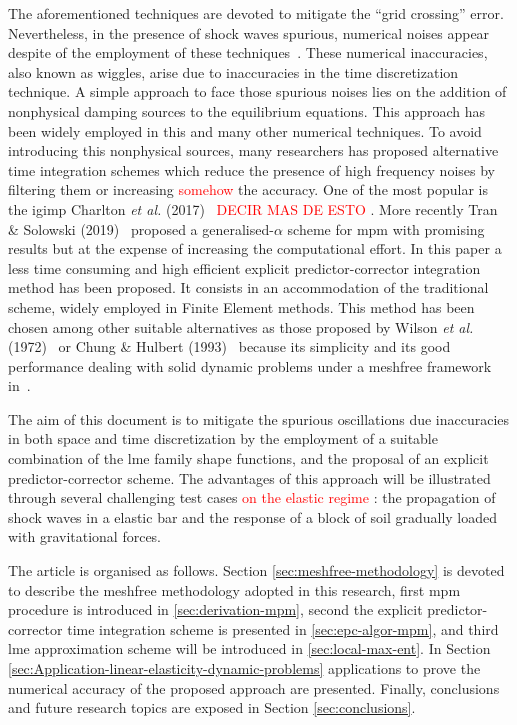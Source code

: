\documentclass[preprint,12pt,a4paper]{elsarticle}
\newcommand{\red}[1]{
  \textcolor{red}{{#1}}
}
\begin{document}
The aforementioned techniques are devoted to mitigate the
``grid crossing'' error. Nevertheless, in the presence of shock waves spurious,
numerical noises appear despite of the employment of these
techniques~\cite{Tran2019e}. These numerical inaccuracies, also known
as wiggles, arise due to inaccuracies in the time discretization technique.
A simple approach to face those spurious noises lies on the addition of nonphysical damping sources to the equilibrium equations. This
approach has been widely employed in this and many other numerical
techniques. To avoid introducing this nonphysical sources, many
researchers has proposed alternative time integration
schemes which reduce the presence of high frequency noises by
filtering them or increasing \red{somehow} the accuracy.  One of the most popular is the \acrfull{igimp}
Charlton {\it et al.} (2017)~\cite{Charlton2017} \red{DECIR MAS DE ESTO}. More recently Tran \&
Solowski (2019)~\cite{Tran2019e} proposed a generalised-$\alpha$ scheme
for \acrshort{mpm} with promising results but at the expense of increasing
the computational effort. In this paper a less time consuming and high
efficient explicit predictor-corrector integration method has been
proposed. It consists in an accommodation of the traditional  scheme, widely employed in Finite Element methods. This method
has been chosen among other suitable alternatives as those proposed
by Wilson {\it et al.} (1972)~\cite{Wilson1972} or Chung \& Hulbert
(1993)~\cite{Geranlized_alpha_1993} because its simplicity and its good
performance dealing with solid dynamic problems under a meshfree
framework in~\cite{Navas2018a}.

The aim of this document is to mitigate the spurious oscillations due
inaccuracies in both space and time discretization by the employment of a
suitable combination of the \acrshort{lme} family shape functions, and the proposal of an explicit predictor-corrector scheme. The advantages of
this approach will be illustrated through several  challenging test cases \red{on the elastic regime}: the
propagation of shock waves in a elastic bar and the response of a block of soil gradually loaded with gravitational forces.

The article is organised as follows. Section \ref{sec:meshfree-methodology}
is devoted to describe the meshfree methodology adopted in this
research, first \acrshort{mpm} procedure is introduced in
\ref{sec:derivation-mpm}, second the explicit predictor-corrector
time integration scheme is presented in \ref{sec:epc-algor-mpm}, and
third \acrshort{lme} approximation scheme will be introduced in
\ref{sec:local-max-ent}. In Section
\ref{sec:Application-linear-elasticity-dynamic-problems} applications
to prove the numerical accuracy of the proposed approach are
presented. Finally, conclusions and future research topics are exposed in Section \ref{sec:conclusions}.
\end{document}
